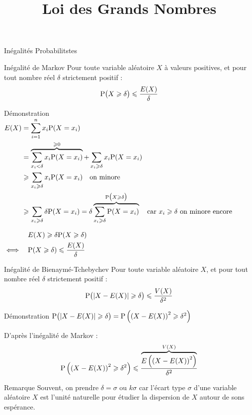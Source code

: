 \documentclass{cours}
\title{Loi des Grands Nombres}
\begin{document}

    \begin{Gpartie}{Inégalités Probabilitstes} 
        \begin{Spartie}{Inégalité de Markov} 
            Pour toute variable aléatoire $X$ à valeurs positives, et pour tout nombre réel $\delta$ strictement positif : \[\mathrm{P}\big(X\geqslant\delta\big)\leqslant\frac{E(X)}{\delta}\]
            \begin{SSpartie}{Démonstration} 
                $\begin{aligned}[t]
                    E(X) &= \sum_{i=1}^n x_i\mathrm{P}(X=x_i) \\
                    &= \overbrace{\sum_{x_i<\delta} x_i\mathrm{P}(X=x_i)}^{\geqslant0} + \sum_{x_i\geqslant\delta} x_i\mathrm{P}(X=x_i) \\
                    &\geqslant\sum_{x_i\geqslant\delta} x_i\mathrm{P}(X=x_i)\quad\text{on minore}\\
                    &\geqslant\sum_{x_i\geqslant\delta} \delta\mathrm{P}(X=x_i)=\delta\overbrace{\sum_{x_i\geqslant\delta}\mathrm{P}(X=x_i)}^{\mathrm{P}\big(X\geqslant\delta\big)}\quad\text{car $x_i\geqslant\delta$ on minore encore}
                \end{aligned}$

                $\begin{aligned}[t]
                    &\quad E(X)\geqslant\delta\mathrm{P}(X\geqslant\delta) \\
                    \iff&\quad \mathrm{P}(X\geqslant\delta)\leqslant\frac{E(X)}{\delta}
                \end{aligned}$
            \end{SSpartie}
        \end{Spartie}
        \pagebreak
        \begin{Spartie}{Inégalité de Bienaymé-Tchebychev} 
            Pour toute variable aléatoire $X$, et pour tout nombre réel $\delta$ strictement positif : \[\mathrm{P}\big(\lvert X-E(X)\rvert\geqslant\delta\big)\leqslant\frac{V(X)}{\delta^2}\]
            \begin{SSpartie}{Démonstration} 
                $\mathrm{P}\big(\lvert X-E(X)\rvert\geqslant\delta\big)=\mathrm{P}\left(\left(X-E(X)\right)^2\geqslant\delta^2\right)$

                D'après l'inégalité de Markov : \[\mathrm{P}\left(\left(X-E(X)\right)^2\geqslant\delta^2\right)\leqslant\frac{\overbrace{E\left(\left(X-E(X)\right)^2\right)}^{V(X)}}{\delta^2}\]
            \end{SSpartie}
        \end{Spartie}
        \begin{Spartie}{Remarque} 
            Souvent, on prendre $\delta=\sigma$ ou $k\sigma$ car l'écart type $\sigma$ d'une variable aléatoire $X$ est l'unité naturelle pour étudier la dispersion de $X$ autour de sons espérance.


\end{Spartie}
\end{Gpartie}
\end{document}
